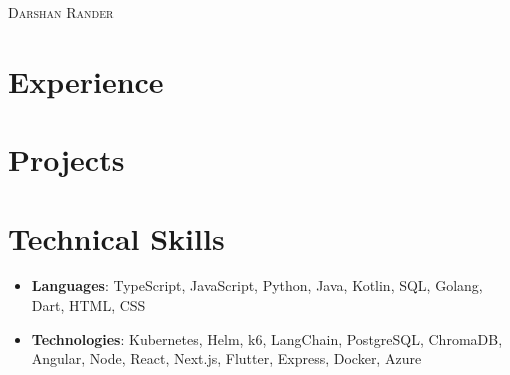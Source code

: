 \documentclass[letterpaper,11pt]{article}
\newcommand{\resumeItem}[1]{
  \item\small{
    {#1 \vspace{-5pt}}
  }
}
\newcommand{\resumeSubHeadingListStart}{\begin{itemize}[leftmargin=0.0in, label={}]}
\newcommand{\resumeSubHeadingListEnd}{\end{itemize}}
\newcommand{\resumeItemListStart}{\begin{itemize}}
\newcommand{\resumeItemListEnd}{\end{itemize}\vspace{-5pt}}
\newcommand{\socialLink}[3]{
    \href{#1}{\raisebox{-0.2\height #2\  #3}}
}
\begin{document}

\begin{center}
    {\Huge \scshape Darshan Rander} \\
    \vspace{1pt}
    \socialLink{mailto:darshandrander@outlook.com}{\faEnvelope}{darshandrander@outlook.com}
    \socialLink{https://linkedin.com/in/darshan-rander}{\faLinkedin}{darshan-rander}
    \socialLink{https://github.com/SirusCodes}{\faGithub}{SirusCodes}
    \socialLink{https://darshanrander.com}{\faGlobe}{darshanrander.com}
    \vspace{-8pt}
\end{center}


\section{Experience}
  \resumeSubHeadingListStart
  \resumeSubHeadingListEnd
\vspace{-10pt}

\section{Projects}
    \vspace{-5pt}
    \resumeSubHeadingListStart
    \resumeSubHeadingListEnd
\vspace{-10pt}


%
\section{Technical Skills}
 \resumeItemListStart
    \resumeItem{\textbf{Languages}{: TypeScript, JavaScript, Python, Java, Kotlin, SQL, Golang, Dart, HTML, CSS}}
    \vspace{-4pt}
    \resumeItem{\textbf{Technologies}{: Kubernetes, Helm, k6, LangChain, PostgreSQL, ChromaDB, Angular, Node, React, Next.js, Flutter, Express, Docker, Azure}}
 \resumeItemListEnd
 \vspace{-8pt}
\end{document}
